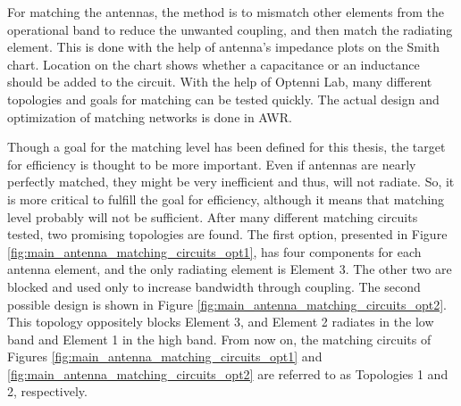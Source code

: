 For matching the antennas, the method is to mismatch other elements from the operational band to reduce the unwanted coupling, and then match the radiating element. This is done with the help of antenna's impedance plots on the Smith chart. Location on the chart shows whether a capacitance or an inductance should be added to the circuit. With the help of Optenni Lab, many different topologies and goals for matching can be tested quickly. The actual design and optimization of matching networks is done in AWR.

Though a goal for the matching level has been defined for this thesis, the target for efficiency is thought to be more important. Even if antennas are nearly perfectly matched, they might be very inefficient and thus, will not radiate. So, it is more critical to fulfill the goal for efficiency, although it means that matching level probably will not be sufficient. After many different matching circuits tested, two promising topologies are found. The first option, presented in Figure \ref{fig:main_antenna_matching_circuits_opt1}, has four components for each antenna element, and the only radiating element is Element 3. The other two are blocked and used only to increase bandwidth through coupling. The second possible design is shown in Figure \ref{fig:main_antenna_matching_circuits_opt2}. This topology oppositely blocks Element 3, and Element 2 radiates in the low band and Element 1 in the high band. From now on, the matching circuits of Figures \ref{fig:main_antenna_matching_circuits_opt1} and \ref{fig:main_antenna_matching_circuits_opt2} are referred to as Topologies 1 and 2, respectively.

